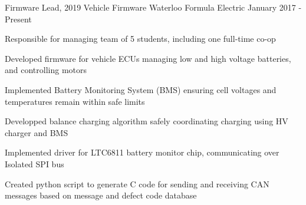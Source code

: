 

\begin{cventries}
  \cventrytwo
    {Firmware Lead, 2019 Vehicle Firmware} %
    {Waterloo Formula Electric} %
    {} %
    {January 2017 - Present} %
    {
      \begin{cvitems}
        \item {Responsible for managing team of 5 students, including one full-time co-op}
        \item {Developed firmware for vehicle ECUs managing low and high voltage batteries, and controlling motors}
        \item {Implemented Battery Monitoring System (BMS) ensuring cell voltages and temperatures remain within safe limits}
        \item {Developped balance charging algorithm safely coordinating charging using HV charger and BMS}
        \item {Implemented driver for LTC6811 battery monitor chip, communicating over Isolated SPI bus}
        \item {Created python script to generate C code for sending and receiving CAN messages based on message and defect code database}
      \end{cvitems}
    }


\end{cventries}
